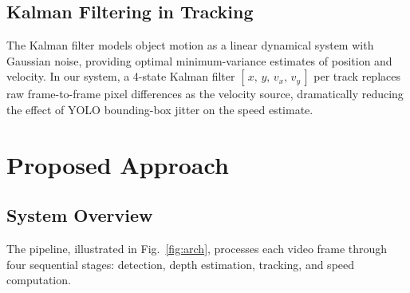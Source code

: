 \documentclass[conference]{IEEEtran}
\begin{document}
\subsection{Kalman Filtering in Tracking}
The Kalman filter \cite{khodarahmi2023kalman} models object
motion as a linear dynamical system with Gaussian noise,
providing optimal minimum-variance estimates of position and
velocity. In our system, a 4-state Kalman filter
$[\,x,\,y,\,v_x,\,v_y\,]$ per track replaces raw frame-to-frame
pixel differences as the velocity source, dramatically reducing
the effect of YOLO bounding-box jitter on the speed estimate.

\section{Proposed Approach}

\subsection{System Overview}
The pipeline, illustrated in Fig.~\ref{fig:arch}, processes
each video frame through four sequential stages: detection,
depth estimation, tracking, and speed computation.
\end{document}
